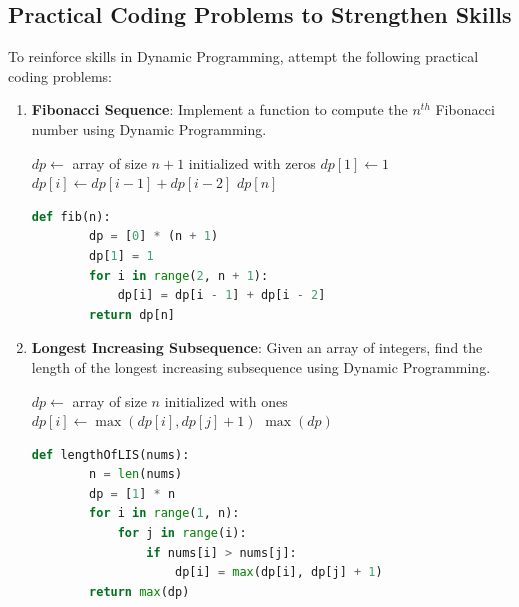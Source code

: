 \documentclass[12pt]{book} %
\begin{document}
\subsection{Practical Coding Problems to Strengthen Skills}
To reinforce skills in Dynamic Programming, attempt the following practical coding problems:

\begin{enumerate}
    \item \textbf{Fibonacci Sequence}: Implement a function to compute the $n^{th}$ Fibonacci number using Dynamic Programming.
    
    \begin{algorithm}[H]
    \caption{Dynamic Programming Solution for Fibonacci Sequence}
    \begin{algorithmic}[1]
        \State $dp \gets$ array of size $n+1$ initialized with zeros
        \State $dp[1] \gets 1$
            \State $dp[i] \gets dp[i-1] + dp[i-2]$
        \EndFor
        \State \Return $dp[n]$
    \EndFunction
    \end{algorithmic}
    \end{algorithm}
    
    \FloatBarrier
    \begin{lstlisting}[language=Python]
    def fib(n):
        dp = [0] * (n + 1)
        dp[1] = 1
        for i in range(2, n + 1):
            dp[i] = dp[i - 1] + dp[i - 2]
        return dp[n]
    \end{lstlisting}
    \FloatBarrier
    
    \item \textbf{Longest Increasing Subsequence}: Given an array of integers, find the length of the longest increasing subsequence using Dynamic Programming.
    
    \begin{algorithm}[H]
    \caption{Dynamic Programming Solution for Longest Increasing Subsequence}
    \begin{algorithmic}[1]
        \State $dp \gets$ array of size $n$ initialized with ones
                    \State $dp[i] \gets \max(dp[i], dp[j]+1)$
                \EndIf
            \EndFor
        \EndFor
        \State \Return $\max(dp)$
    \EndFunction
    \end{algorithmic}
    \end{algorithm}
    
    \FloatBarrier
    \begin{lstlisting}[language=Python]
    def lengthOfLIS(nums):
        n = len(nums)
        dp = [1] * n
        for i in range(1, n):
            for j in range(i):
                if nums[i] > nums[j]:
                    dp[i] = max(dp[i], dp[j] + 1)
        return max(dp)
    \end{lstlisting}
    \FloatBarrier
    
    
\end{enumerate}
\end{document}
